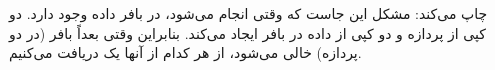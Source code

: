 \section{}
\paragraph{}\label{answer:50}
چاپ می‌کند:
\LTR\noindent
{}
\RTL
مشکل این جاست که وقتی  انجام می‌شود، در بافر  داده وجود دارد.  دو کپی از پردازه و دو کپی از داده در بافر  ایجاد می‌کند. بنابراین وقتی بعداً بافر (در دو پردازه) خالی می‌شود، از هر کدام از آنها یک  دریافت می‌کنیم.
